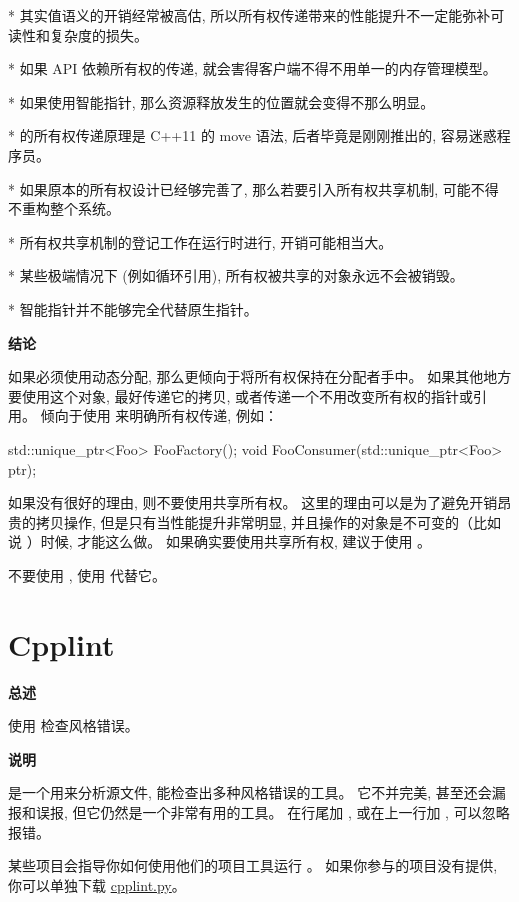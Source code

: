 * 其实值语义的开销经常被高估, 所以所有权传递带来的性能提升不一定能弥补可读性和复杂度的损失。

* 如果 API 依赖所有权的传递, 就会害得客户端不得不用单一的内存管理模型。

* 如果使用智能指针, 那么资源释放发生的位置就会变得不那么明显。

*  的所有权传递原理是 C++11 的 move 语法, 后者毕竟是刚刚推出的, 容易迷惑程序员。

* 如果原本的所有权设计已经够完善了, 那么若要引入所有权共享机制, 可能不得不重构整个系统。

* 所有权共享机制的登记工作在运行时进行, 开销可能相当大。

* 某些极端情况下 (例如循环引用), 所有权被共享的对象永远不会被销毁。

* 智能指针并不能够完全代替原生指针。

\textbf{ 结论}

如果必须使用动态分配, 那么更倾向于将所有权保持在分配者手中。 如果其他地方要使用这个对象, 最好传递它的拷贝, 或者传递一个不用改变所有权的指针或引用。 倾向于使用  来明确所有权传递, 例如：

\begin{cppcode}
  std::unique_ptr<Foo> FooFactory();
  void FooConsumer(std::unique_ptr<Foo> ptr);
\end{cppcode}

如果没有很好的理由, 则不要使用共享所有权。 这里的理由可以是为了避免开销昂贵的拷贝操作, 但是只有当性能提升非常明显, 并且操作的对象是不可变的（比如说  ）时候, 才能这么做。 如果确实要使用共享所有权, 建议于使用  。

不要使用 , 使用  代替它。

\section{Cpplint}

\textbf{ 总述}

使用  检查风格错误。

\textbf{ 说明}

 是一个用来分析源文件, 能检查出多种风格错误的工具。 它不并完美, 甚至还会漏报和误报, 但它仍然是一个非常有用的工具。 在行尾加 , 或在上一行加 , 可以忽略报错。

某些项目会指导你如何使用他们的项目工具运行 。 如果你参与的项目没有提供, 你可以单独下载 \href{http://github.com/google/styleguide/blob/gh-pages/cpplint/cpplint.py}{cpplint.py}。


